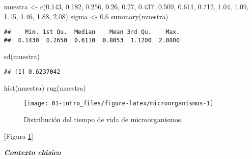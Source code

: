 \documentclass[
]{book}
\newenvironment{Shaded}{\begin{snugshade}}{\end{snugshade}}
\newcommand{\FloatTok}[1]{\textcolor[rgb]{0.00,0.00,0.81}{#1}}
\newcommand{\FunctionTok}[1]{\textcolor[rgb]{0.00,0.00,0.00}{#1}}
\newcommand{\NormalTok}[1]{#1}
\newcommand{\OtherTok}[1]{\textcolor[rgb]{0.56,0.35,0.01}{#1}}
\theoremstyle{break}
\theoremstyle{definition}
\theoremstyle{definition}
\theoremstyle{definition}
\theoremstyle{definition}
\theoremstyle{remark}
\begin{document}
\begin{Shaded}
\begin{Highlighting}[]
\NormalTok{muestra }\OtherTok{\textless{}{-}} \FunctionTok{c}\NormalTok{(}\FloatTok{0.143}\NormalTok{, }\FloatTok{0.182}\NormalTok{, }\FloatTok{0.256}\NormalTok{, }\FloatTok{0.26}\NormalTok{, }\FloatTok{0.27}\NormalTok{, }\FloatTok{0.437}\NormalTok{, }\FloatTok{0.509}\NormalTok{, }
    \FloatTok{0.611}\NormalTok{, }\FloatTok{0.712}\NormalTok{, }\FloatTok{1.04}\NormalTok{, }\FloatTok{1.09}\NormalTok{, }\FloatTok{1.15}\NormalTok{, }\FloatTok{1.46}\NormalTok{, }\FloatTok{1.88}\NormalTok{, }\FloatTok{2.08}\NormalTok{)}
\NormalTok{sigma }\OtherTok{\textless{}{-}} \FloatTok{0.6}
\FunctionTok{summary}\NormalTok{(muestra)}
\end{Highlighting}
\end{Shaded}

\begin{verbatim}
##    Min. 1st Qu.  Median    Mean 3rd Qu.    Max. 
##  0.1430  0.2650  0.6110  0.8053  1.1200  2.0800
\end{verbatim}

\begin{Shaded}
\begin{Highlighting}[]
\FunctionTok{sd}\NormalTok{(muestra)}
\end{Highlighting}
\end{Shaded}

\begin{verbatim}
## [1] 0.6237042
\end{verbatim}

\begin{Shaded}
\begin{Highlighting}[]
\FunctionTok{hist}\NormalTok{(muestra)}
\FunctionTok{rug}\NormalTok{(muestra)}
\end{Highlighting}
\end{Shaded}

\begin{figure}[!htb]

{\centering \texttt{[image: 01-intro\_files/figure-latex/microorganismos-1]} 

}

\caption{Distribución del tiempo de vida de microorganismos.}\label{fig:microorganismos}
\end{figure}

{[}Figura \ref{fig:microorganismos}{]}

\textbf{\emph{Contexto clásico}}
\end{document}
